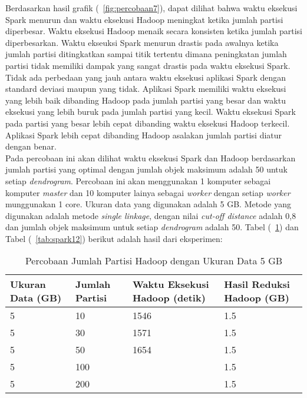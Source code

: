 Berdasarkan hasil grafik (~\ref{fig:percobaan7}), dapat dilihat bahwa waktu eksekusi Spark menurun dan waktu eksekusi Hadoop meningkat ketika jumlah partisi diperbesar. Waktu eksekusi Hadoop menaik secara konsisten ketika jumlah partisi diperbesarkan. Waktu ekseuksi Spark menurun drastis pada awalnya ketika jumlah partisi ditingkatkan sampai titik tertentu dimana peningkatan jumlah partisi tidak memiliki dampak yang sangat drastis pada waktu eksekusi Spark. Tidak ada perbedaan yang jauh antara waktu eksekusi aplikasi Spark dengan standard deviasi maupun yang tidak. Aplikasi Spark memiliki waktu eksekusi yang lebih baik dibanding Hadoop pada jumlah partisi yang besar dan waktu eksekusi yang lebih buruk pada jumlah partisi yang kecil. Waktu eksekusi Spark pada partisi yang besar lebih cepat dibanding waktu eksekusi Hadoop terkecil. Aplikasi Spark lebih cepat dibanding Hadoop asalakan jumlah partisi diatur dengan benar.\\







Pada percobaan ini akan dilihat waktu eksekusi Spark dan Hadoop berdasarkan jumlah partisi yang optimal dengan jumlah objek maksimum adalah 50 untuk setiap \textit{dendrogram}. Percobaan ini akan menggunakan 1 komputer sebagai komputer \textit{master} dan 10 komputer lainya sebagai \textit{worker} dengan setiap \textit{worker} munggunakan 1 core. Ukuran data yang digunakan adalah 5 GB. Metode yang digunakan adalah metode \textit{single linkage}, dengan nilai \textit{cut-off distance} adalah 0,8 dan jumlah objek maksimum untuk setiap \textit{dendrogram} adalah 50. Tabel (~\ref{tab:spark11}) dan Tabel (~\ref{tab:spark12}) berikut adalah hasil dari eksperimen:





\begin{table}[H] 
	\centering 
	\caption{Percobaan Jumlah Partisi Hadoop dengan Ukuran Data 5 GB}
	\label{tab:spark11}
	\begin{tabular}{|p{3cm}|p{3cm}|p{4cm}|p{4cm}|}
\hline
Ukuran Data (GB) & Jumlah Partisi &  Waktu Eksekusi Hadoop (detik) & Hasil Reduksi Hadoop (GB)\\
\hline
5 & 10 & 1546  & 1.5  \\
\hline
5 & 30 & 1571  & 1.5  \\
\hline
5 & 50 & 1654  & 1.5   \\
\hline
5 & 100 &   & 1.5   \\
\hline
5 & 200 &   & 1.5   \\
\hline


\hline

	\end{tabular} 
\end{table}






